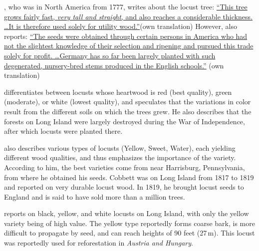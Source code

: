 \citet[p.~67]{wangenheim1781nordamericanischeHolzarten}, who was in North America from 1777, writes about the locust tree: \hyperlink{german:wangenheim1781nordamericanischeHolzartenA}{\enquote{This tree grows fairly fast, \emph{very tall and straight}, and also reaches a considerable thickness. \dots It is therefore used solely for utility wood.}}(own translation) However, \citet[pp.~22--23]{wangenheim1781nordamericanischeHolzarten} also reports: \hyperlink{german:wangenheim1781nordamericanischeHolzartenB}{\enquote{The seeds were obtained through certain persons in America who had not the slightest knowledge of their selection and ripening and pursued this trade solely for profit. \dots Germany has so far been largely planted with such degenerated, nursery-bred stems produced in the English schools.}} (own translation)

\citet[p.~249]{Michaux1813arbres} differentiates between locusts whose heartwood is red (best quality), green (moderate), or white (lowest quality), and speculates that the variations in color result from the different soils on which the trees grew. He also describes that the forests on Long Island were largely destroyed during the War of Independence, after which locusts were planted there.

\citet{cobbett1825woodlands} also describes various types of locusts (Yellow, Sweet, Water), each yielding different wood qualities, and thus emphasizes the importance of the variety. According to him, the best varieties come from near Harrisburg, Pennsylvania, from where he obtained his seeds. Cobbett was on Long Island from 1817 to 1819 and reported on very durable locust wood. In 1819, he brought locust seeds to England and is said to have sold more than a million trees.

\citet{hicks1883robinie} reports on black, yellow, and white locusts on Long Island, with only the yellow variety being of high value. The yellow type reportedly forms coarse bark, is more difficult to propagate by seed, and can reach heights of 90 feet (27\,m). This locust was reportedly used for reforestation in \emph{Austria and Hungary}.

